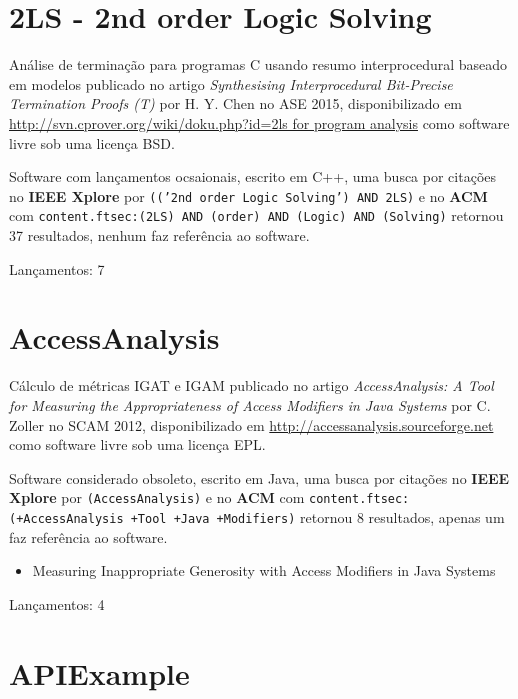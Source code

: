 

\label{softwares-summary}

\section{2LS - 2nd order Logic Solving}

Análise de terminação para programas C usando resumo interprocedural baseado em modelos
publicado no artigo {\it Synthesising Interprocedural Bit-Precise Termination Proofs (T)}
por H. Y. Chen
no ASE 2015,
disponibilizado em \url{http://svn.cprover.org/wiki/doku.php?id=2ls for program analysis}
como software livre
sob uma licença BSD.

Software com lançamentos ocsaionais,
escrito em C++,
uma busca por citações no {\bf IEEE Xplore} por
\texttt{(('2nd order Logic Solving') AND 2LS)}
e no {\bf ACM} com
\texttt{content.ftsec:(2LS) AND (order) AND (Logic) AND (Solving)}
retornou
37 resultados,
nenhum faz referência ao software.


Lançamentos: 7

\section{AccessAnalysis}

Cálculo de métricas IGAT e IGAM
publicado no artigo {\it AccessAnalysis: A Tool for Measuring the Appropriateness of Access Modifiers in Java Systems}
por C. Zoller
no SCAM 2012,
disponibilizado em \url{http://accessanalysis.sourceforge.net}
como software livre
sob uma licença EPL.

Software considerado obsoleto,
escrito em Java,
uma busca por citações no {\bf IEEE Xplore} por
\texttt{(AccessAnalysis)}
e no {\bf ACM} com
\texttt{content.ftsec:(+AccessAnalysis +Tool +Java +Modifiers)}
retornou
8 resultados,
apenas um faz referência ao software.

\begin{itemize}
\item Measuring Inappropriate Generosity with Access Modifiers in Java Systems
\end{itemize}

Lançamentos: 4

\section{APIExample}

